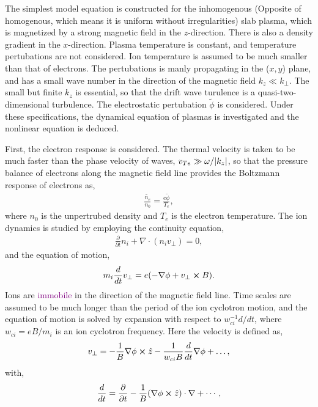 The simplest model equation is constructed for the inhomogenous (Opposite of homogenous, which means it is uniform without irregularities) slab plasma, which is magnetized by a strong magnetic field in the $z$-direction. There is also a density gradient in the $x$-direction. Plasma temperature is constant, and temperature pertubations are not considered. Ion temperature is assumed to be much smaller than that of electrons. The pertubations is manly propagating in the ($x,y$) plane, and has a small wave number in the direction of the magnetic field $k_z \ll k_{\perp}$. The small but finite $k_z$ is essential, so that the drift wave turulence is a quasi-two-dimensional turbulence. The electrostatic pertubation $\tilde{\phi}$ is considered. Under these specifications, the dynamical equation of plasmas is investigated and the nonlinear equation is deduced. 

First, the electron response is considered. The thermal velocity is taken to be much faster than the phase velocity of waves, $v_{Te} \gg \omega/\abs{k_z}$, so that the pressure balance of electrons along the magnetic field line provides the Boltzmann response of electrons as, 
\begin{align}
	\frac{\tilde{n_e}}{n_0} = \frac{e \tilde{\phi}}{T_e},
\end{align}
where $n_0$ is the unpertrubed density and $T_e$ is the electron temperature. The ion dynamics is studied by employing the continuity equation, 
\begin{align}
	\frac{\partial }{\partial t} n_i + \nabla \cdot (n_i v_{\perp}) = 0,
\end{align}
and the equation of motion, 
\begin{align}
	m_i \frac{d}{d t} v_{\perp} = e (- \nabla \phi + v_{\perp} \cross B).
\end{align}
Ions are \textcolor{purple}{immobile} in the direction of the magnetic field line. Time scales are assumed to be much longer than the period of the ion cyclotron motion, and the equation of motion is solved by expansion with respect to $w_{ci}^{-1} d/dt$, where $w_{ci} = eB/m_i$ is an ion cyclotron frequency. Here the velocity is defined as, 
\begin{align}
	v_{\perp} = -\frac{1}{B} \nabla \phi \cross \hat{z} - \frac{1}{w_{ci} B}\frac{d}{dt} \nabla \phi + \dots , 
\end{align} 
with, 
\begin{align}
	\frac{d}{dt} = \frac{\partial}{\partial t} - \frac{1}{B} (\nabla \phi \cross \hat{z}) \cdot \nabla + \cdots ,
\end{align}

